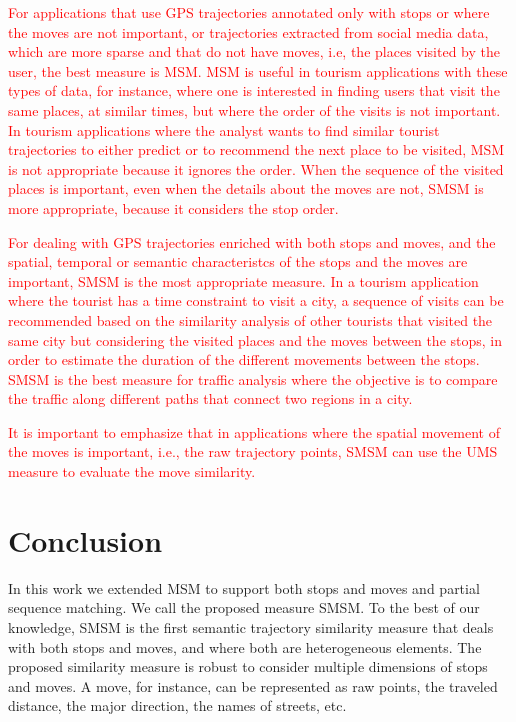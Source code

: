 \documentclass[12pt]{article}
\begin{document}
\textcolor{red}{For applications that use GPS trajectories annotated only with stops or where the moves are not important, or trajectories extracted from social media data, which are more sparse and that do not have moves, i.e, the places visited by the user, the best measure is MSM. MSM is useful in tourism applications with these types of data, for instance, where one is interested in finding users that visit the same places, at similar times, but where the order of the visits is not important. In tourism applications where the analyst wants to find similar tourist trajectories to either predict or to recommend the next place to be visited, MSM is not appropriate because it ignores the order. When the sequence of the visited places is important, even when the details about the moves are not, SMSM is more appropriate, because it considers the stop order.}

\textcolor{red}{For dealing with GPS trajectories enriched with both stops and moves, and the spatial, temporal or semantic characteristcs of the stops and the moves are important, SMSM is the most appropriate measure. In a tourism application where the tourist has a time constraint to visit a city, a sequence of visits can be recommended based on the similarity analysis of other tourists that visited the same city but considering the visited places and the moves between the stops, in order to estimate the duration of the different movements between the stops. SMSM is the best measure for traffic analysis where the objective is to compare the traffic along  different paths that connect two regions in a city.}

\textcolor{red}{It is important to emphasize that in applications where the spatial movement of the moves is important, i.e., the raw trajectory points, SMSM can use the UMS measure to evaluate the move similarity.}

\section{Conclusion} \label{sec:conclusions}
In this work we extended MSM to support both stops and moves and partial sequence matching. We call the proposed measure SMSM. To the best of our knowledge, SMSM is the first semantic trajectory similarity measure that deals with both stops and moves, and where both are heterogeneous elements. 
The proposed similarity measure is robust  to consider multiple dimensions of stops and moves. A move, for instance, can be represented as raw points, the traveled distance, the major direction, the names of streets, etc.
\end{document}
